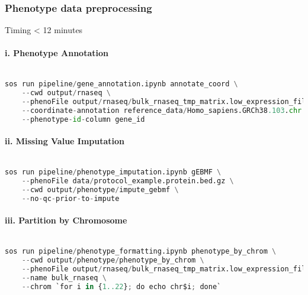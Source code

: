 \documentclass[12pt]{article}
\begin{document}
\subsubsection*{Phenotype data preprocessing}
Timing < 12 minutes

\paragraph*{i. Phenotype Annotation}


\noindent
\begin{lstlisting}[language=Python]

sos run pipeline/gene_annotation.ipynb annotate_coord \
    --cwd output/rnaseq \
    --phenoFile output/rnaseq/bulk_rnaseq_tmp_matrix.low_expression_filtered.outlier_removed.tmm.expression.bed.gz \
    --coordinate-annotation reference_data/Homo_sapiens.GRCh38.103.chr.reformatted.collapse_only.gene.ERCC.gtf \
    --phenotype-id-column gene_id

\end{lstlisting}




\paragraph*{ii. Missing Value Imputation}


\noindent
\begin{lstlisting}[language=Python]

sos run pipeline/phenotype_imputation.ipynb gEBMF \
    --phenoFile data/protocol_example.protein.bed.gz \
    --cwd output/phenotype/impute_gebmf \
    --no-qc-prior-to-impute

\end{lstlisting}




\paragraph*{iii. Partition by Chromosome}


\noindent
\begin{lstlisting}[language=Python]

sos run pipeline/phenotype_formatting.ipynb phenotype_by_chrom \
    --cwd output/phenotype/phenotype_by_chrom \
    --phenoFile output/rnaseq/bulk_rnaseq_tmp_matrix.low_expression_filtered.outlier_removed.tmm.expression.bed.bed.gz \
    --name bulk_rnaseq \
    --chrom `for i in {1..22}; do echo chr$i; done`

\end{lstlisting}
\end{document}
